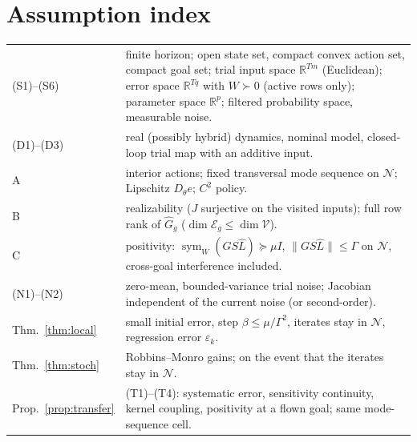 \documentclass[11pt]{article}
\theoremstyle{definition}
\theoremstyle{remark}
\newcommand{\R}{\mathbb{R}}
\newcommand{\cV}{\mathcal{V}}
\newcommand{\cE}{\mathcal{E}}
\newcommand{\cN}{\mathcal{N}}
\newcommand{\n}[1]{\lVert #1\rVert}
\newcommand{\symW}{\operatorname{sym}_W}
\newcommand{\Ghat}{\widehat G}
\newcommand{\Lhat}{\widehat L}
\begin{document}
\section*{Assumption index}
\begin{center}
\begin{tabular}{@{}lp{}@{}}
\toprule
(S1)--(S6) & finite horizon; open state set, compact convex action set, compact goal set; trial input space $\R^{Tm}$
(Euclidean); error space $\R^{Tq}$ with $W\succ0$ (active rows only); parameter space $\R^p$; filtered probability
space, measurable noise.\\
(D1)--(D3) & real (possibly hybrid) dynamics, nominal model, closed-loop trial map with an additive input.\\
A & interior actions; fixed transversal mode sequence on $\cN$; Lipschitz $D_\theta e$; $C^2$ policy.\\
B & realizability ($J$ surjective on the visited inputs); full row rank of $\Ghat_g$ ($\dim\cE_g\le\dim\cV$).\\
C & positivity: $\symW(GS\Lhat)\succeq\mu I$, $\n{GS\Lhat}\le\Gamma$ on $\cN$, cross-goal interference included.\\
(N1)--(N2) & zero-mean, bounded-variance trial noise; Jacobian independent of the current noise (or second-order).\\
Thm.~\ref{thm:local} & small initial error, step $\beta\le\mu/\Gamma^2$, iterates stay in $\cN$, regression error $\varepsilon_k$.\\
Thm.~\ref{thm:stoch} & Robbins--Monro gains; on the event that the iterates stay in $\cN$.\\
Prop.~\ref{prop:transfer} & (T1)--(T4): systematic error, sensitivity continuity, kernel coupling, positivity at a
flown goal; same mode-sequence cell.\\
\bottomrule
\end{tabular}
\end{center}
\end{document}
